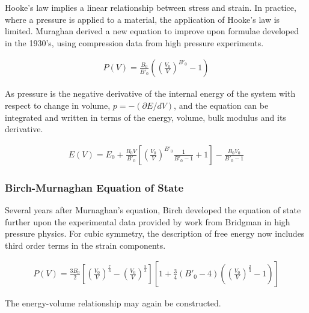 Hooke's law implies a linear relationship between stress and strain.  In practice, where a pressure is applied to a material, the application of Hooke's law is limited\cite{murnaghaneq}.  Muraghan derived a new equation to improve upon formulae developed in the 1930's, using compression data from high pressure experiments.

\begin{equation}
\begin{split}
P(V) = \frac{B_0}{{B'}_0}\left(\left(\frac{V_0}{V}\right)^{{B'}_0}-1\right)
\end{split}
\label{eq:eqMurnachanEquationofStatePressure}
\end{equation}

As pressure is the negative derivative of the internal energy of the system with respect to change in volume, $p = -(\partial E/dV)$, and the equation can be integrated and written in terms of the energy, volume, bulk modulus and its derivative\cite{crystaleos}.

\begin{equation}
\begin{split}
E(V) = E_0 + \frac{B_0 V}{{B'}_0} \left[\left(\frac{V_0}{V}\right)^{{B'}_0} \frac{1}{{B'}_0 - 1} + 1 \right] - \frac{B_0 V_0}{{B'}_0-1}
\end{split}
\label{eq:eqMurnachanEquationofStateEnergy}
\end{equation}

\subsubsection{Birch-Murnaghan Equation of State}

Several years after Murnaghan's equation, Birch developed the equation of state further upon the experimental data provided by work from Bridgman in high pressure physics.  For cubic symmetry, the description of free energy now includes third order terms in the strain components\cite{birchmurnaghaneq}.

\begin{equation}
\begin{split}
P(V) = \frac{3 B_0}{2} \left[\left(\frac{V_0}{V}\right)^{\frac{7}{3}}-\left(\frac{V_0}{V}\right)^{\frac{5}{3}}\right] \left[1 + \frac{3}{4}({B'}_0-4)\left(\left(\frac{V_0}{V}\right)^{\frac{2}{3}}-1\right)\right]
\end{split}
\label{eq:eqMurnachan Equation of State}
\end{equation}

The energy-volume relationship may again be constructed\cite{crystaleos}.

